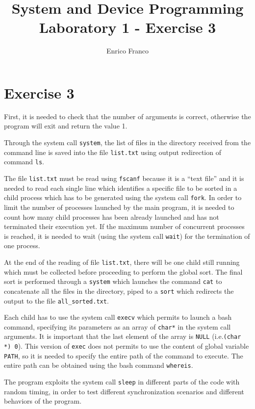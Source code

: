 \documentclass{report}
\author{Enrico Franco}
\title{System and Device Programming \\
	Laboratory 1 - Exercise 3}
\begin{document}
\section*{Exercise 3}
First, it is needed to check that the number of arguments is correct, otherwise the program will exit and return the value 1.

Through the system call \texttt{system}, the list of files in the directory received from the command line is saved into the file \texttt{list.txt} using output redirection of command \texttt{ls}.

The file \texttt{list.txt} must be read using \texttt{fscanf} because it is a ``text file'' and it is needed to read each single line which identifies a specific file to be sorted in a child process which has to be generated using the system call \texttt{fork}.
In order to limit the number of processes launched by the main program, it is needed to count how many child processes has been already launched and has not terminated their execution yet. If the maximum number of concurrent processes is reached, it is needed to wait (using the system call \texttt{wait}) for the termination of one process.

At the end of the reading of file \texttt{list.txt}, there will be one child still running which must be collected before proceeding to perform the global sort. The final sort is performed through a \texttt{system} which launches the command \texttt{cat} to concatenate all the files in the directory, piped to a \texttt{sort} which redirects the output to the file \texttt{all\_sorted.txt}.

Each child has to use the system call \texttt{execv} which permits to launch a bash command, specifying its parameters as an array of \texttt{char*} in the system call arguments. It is important that the last element of the array is \texttt{NULL} (i.e.\@ \texttt{(char *) 0}). This version of \texttt{exec} does not permits to use the content of global variable \texttt{PATH}, so it is needed to specify the entire path of the command to execute. The entire path can be obtained using the bash command \texttt{whereis}.

The program exploits the system call \texttt{sleep} in different parts of the code with random timing, in order to test different synchronization scenarios and different behaviors of the program.
\end{document}
